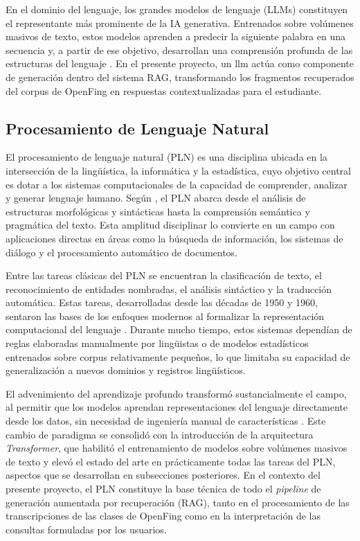 En el dominio del lenguaje, los grandes modelos de lenguaje (LLMs) constituyen el representante más prominente de la IA generativa. Entrenados sobre volúmenes masivos de texto, estos modelos aprenden a predecir la siguiente palabra en una secuencia y, a partir de ese objetivo, desarrollan una comprensión profunda de las estructuras del lenguaje \cite{Zhao2023LLMSurvey}. En el presente proyecto, un \acrshort{llm} actúa como componente de generación dentro del sistema RAG, transformando los fragmentos recuperados del corpus de OpenFing en respuestas contextualizadas para el estudiante.

\subsection{Procesamiento de Lenguaje Natural}
\label{subsection:2-NLP}

El procesamiento de lenguaje natural (PLN) es una disciplina ubicada en la intersección de la lingüística, la informática y la estadística, cuyo objetivo central es dotar a los sistemas computacionales de la capacidad de comprender, analizar y generar lenguaje humano. Según \cite{SpeechandLanguageProcessing}, el PLN abarca desde el análisis de estructuras morfológicas y sintácticas hasta la comprensión semántica y pragmática del texto. Esta amplitud disciplinar lo convierte en un campo con aplicaciones directas en áreas como la búsqueda de información, los sistemas de diálogo y el procesamiento automático de documentos.

Entre las tareas clásicas del PLN se encuentran la clasificación de texto, el reconocimiento de entidades nombradas, el análisis sintáctico y la traducción automática. Estas tareas, desarrolladas desde las décadas de 1950 y 1960, sentaron las bases de los enfoques modernos al formalizar la representación computacional del lenguaje \cite{SpeechandLanguageProcessing}. Durante mucho tiempo, estos sistemas dependían de reglas elaboradas manualmente por lingüistas o de modelos estadísticos entrenados sobre corpus relativamente pequeños, lo que limitaba su capacidad de generalización a nuevos dominios y registros lingüísticos.

El advenimiento del aprendizaje profundo transformó sustancialmente el campo, al permitir que los modelos aprendan representaciones del lenguaje directamente desde los datos, sin necesidad de ingeniería manual de características \cite{Goodfellow-et-al-2016}. Este cambio de paradigma se consolidó con la introducción de la arquitectura \textit{Transformer}, que habilitó el entrenamiento de modelos sobre volúmenes masivos de texto y elevó el estado del arte en prácticamente todas las tareas del PLN, aspectos que se desarrollan en subsecciones posteriores. En el contexto del presente proyecto, el PLN constituye la base técnica de todo el \textit{pipeline} de generación aumentada por recuperación (RAG), tanto en el procesamiento de las transcripciones de las clases de OpenFing como en la interpretación de las consultas formuladas por los usuarios.

